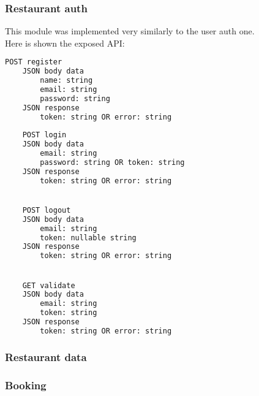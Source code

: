 \subsubsection{Restaurant auth}

This module was implemented very similarly to the user auth one.\\

Here is shown the exposed API:\\


\begin{lstlisting}[language=bash,caption={Restaurant auth exposed API}]
    POST register
    JSON body data
        name: string
        email: string
        password: string
    JSON response
        token: string OR error: string
        
    POST login
    JSON body data
        email: string
        password: string OR token: string
    JSON response
        token: string OR error: string


    POST logout
    JSON body data
        email: string
        token: nullable string
    JSON response
        token: string OR error: string


    GET validate
    JSON body data
        email: string
        token: string
    JSON response
        token: string OR error: string
\end{lstlisting}

\subsubsection{Restaurant data}


\subsubsection{Booking}

